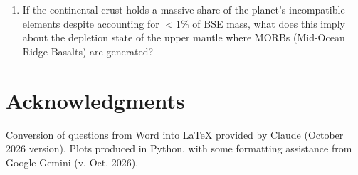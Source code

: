 \documentclass{template}
\newcommand{\solution}[1]{%
\iftoggle{showanswers}{%
\begin{solutionbox}
        #1
\end{solutionbox}%
  }{}%
}
\begin{document}
\begin{enumerate}[label=\textbf{\arabic*.}]
\begin{enumerate}[label=\alph*)]
\item If the continental crust holds a massive share of the planet's incompatible elements despite accounting for $<1\%$ of BSE mass, what does this imply about the depletion state of the upper mantle where MORBs (Mid-Ocean Ridge Basalts) are generated?
\solution{
    If the continental crust holds a massive share of the planet's incompatible elements despite accounting for $<1\%$ of BSE mass, this indicates that the upper mantle (MORB source) should be very depleted in incompatible elements.
}
\end{enumerate}

\end{enumerate}

\section*{Acknowledgments}
Conversion of questions from Word into LaTeX provided by Claude (October 2026 version). Plots produced in Python, with some formatting assistance from Google Gemini (v. Oct. 2026).

\singlespacing
\printbibliography[title={References}]



\end{document}
